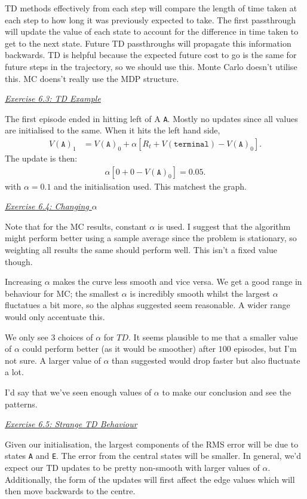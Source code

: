 \documentclass{article}
\newcommand{\myq}[1]{%
	\vspace{1em}
	\noindent\underline{\emph{Exercise #1}}\vspace{0.25em}\linebreak
}
\begin{document}
TD methods effectively from each step will compare the length of time taken at each step to how long it was previously expected to take. The first passthrough will update the value of each state to account for the difference in time taken to get to the next state. Future TD passthroughs will propagate this information backwards. TD is helpful because the expected future cost to go is the same for future steps in the trajectory, so we should use this. Monte Carlo doesn't utilise this. MC doens't really use the MDP structure. 

\myq{6.3: TD Example}
The first episode ended in hitting left of A \texttt{A}. Mostly no updates since all values are initialised to the same. When it hits the left hand side, 
\begin{align}
V(\texttt{A})_{1} &= V(\texttt{A})_{0} + \alpha [R_t + V(\texttt{terminal}) - V(\texttt{A})_{0}].
\end{align}
The update is then:
\begin{align}
\alpha [0 + 0 - V(\texttt{A})_{0}] = 0.05.
\end{align}
with $\alpha = 0.1$ and the initialisation used. This matchest the graph. 

\myq{6.4: Changing $\alpha$}
Note that for the MC results, constant $\alpha$ is used. I suggest that the algorithm might perform better using a sample average since the problem is stationary, so weighting all results the same should perform well.  This isn't a fixed value though. 

Increasing $\alpha$ makes the curve less smooth and vice versa. We get a good range in behaviour for MC; the smallest $\alpha$ is incredibly smooth whilst the largest $\alpha$ fluctatues a bit more, so the alphas suggested seem reasonable. A wider range would only accentuate this. 

We only see $3$ choices of $\alpha$ for $TD$. It seems plausible to me that a smaller value of $\alpha$ could perform better (as it would be smoother) after $100$ episodes, but I'm not sure. A larger value of $\alpha$ than suggested would drop faster but also fluctuate a lot. 

I'd say that we've seen enough values of $\alpha$ to make our conclusion and see the patterns. 

\myq{6.5: Strange TD Behaviour}
Given our initialisation, the largest components of the RMS error will be due to states \texttt{A} and \texttt{E}. The error from the central states will be smaller. In general, we'd expect our TD updates to be pretty non-smooth with larger values of $\alpha$. Additionally, the form of the updates will first affect the edge values which will then move backwards to the centre. 
\end{document}
